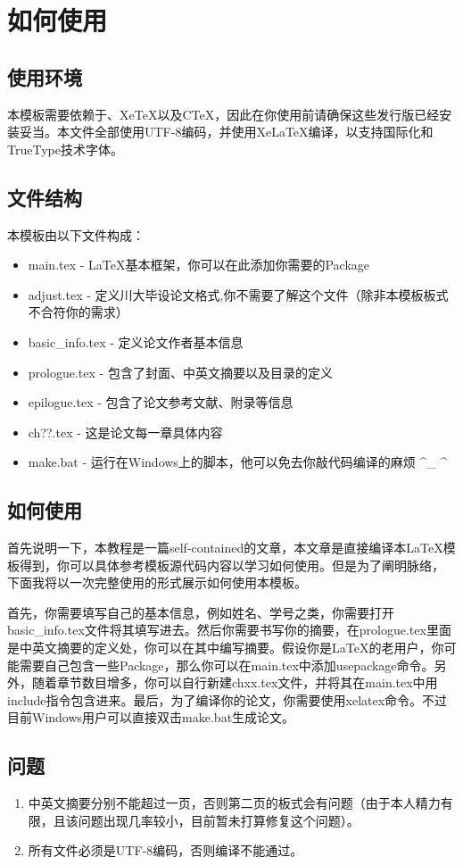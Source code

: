\chapter{如何使用}
\section{使用环境}
本模板需要依赖于\LaTeXe 、Xe\TeX 以及C\TeX ，因此在你使用前请确保这些发行版已经安装妥当。本文件全部使用UTF-8编码，并使用Xe\LaTeX 编译，以支持国际化和TrueType技术字体。

\section{文件结构}
本模板由以下文件构成：
\begin{itemize}
\item main.tex - \LaTeX 基本框架，你可以在此添加你需要的Package
\item adjust.tex - 定义川大毕设论文格式,你不需要了解这个文件（除非本模板板式不合符你的需求）
\item basic\_info.tex - 定义论文作者基本信息
\item prologue.tex - 包含了封面、中英文摘要以及目录的定义
\item epilogue.tex - 包含了论文参考文献、附录等信息
\item ch??.tex - 这是论文每一章具体内容
\item make.bat - 运行在Windows上的脚本，他可以免去你敲代码编译的麻烦 \textasciicircum \_ \textasciicircum
\end{itemize}

\section{如何使用}
首先说明一下，本教程是一篇self-contained的文章，本文章是直接编译本\LaTeX 模板得到，你可以具体参考模板源代码内容以学习如何使用。但是为了阐明脉络， 下面我将以一次完整使用的形式展示如何使用本模板。

首先，你需要填写自己的基本信息，例如姓名、学号之类，你需要打开basic\_info.tex文件将其填写进去。然后你需要书写你的摘要，在prologue.tex里面是中英文摘要的定义处，你可以在其中编写摘要。假设你是\LaTeX 的老用户，你可能需要自己包含一些Package，那么你可以在main.tex中添加usepackage命令。另外，随着章节数目增多，你可以自行新建chxx.tex文件，并将其在main.tex中用include指令包含进来。最后，为了编译你的论文，你需要使用xelatex命令。不过目前Windows用户可以直接双击make.bat生成论文。

\section{问题}
\begin{enumerate}
\item 中英文摘要分别不能超过一页，否则第二页的板式会有问题（由于本人精力有限，且该问题出现几率较小，目前暂未打算修复这个问题）。
\item 所有文件必须是UTF-8编码，否则编译不能通过。
\end{enumerate}